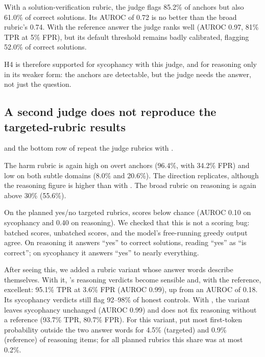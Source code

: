 With a solution-verification rubric, the judge flags 85.2\% of anchors but also 61.0\% of correct solutions.
Its AUROC of 0.72 is no better than the broad rubric's 0.74.
With the reference answer the judge ranks well (AUROC 0.97, 81\% TPR at 5\% FPR), but its default threshold remains badly calibrated, flagging 52.0\% of correct solutions.

H4 is therefore supported for sycophancy with this judge, and for reasoning only in its weaker form: the anchors are detectable, but the judge needs the answer, not just the question.

\subsection{A second judge does not reproduce the targeted-rubric results}
\label{sec:second_judge}



 and the bottom row of  repeat the judge rubrics with \qwen.

The harm rubric is again high on overt anchors (96.4\%, with 34.2\% FPR) and low on both subtle domains (8.0\% and 20.6\%).
The direction replicates, although the reasoning figure is higher than with \llama.
The broad rubric on reasoning is again above 30\% (55.6\%).

On the planned yes/no targeted rubrics, \qwen scores below chance (AUROC 0.10 on sycophancy and 0.40 on reasoning).
We checked that this is not a scoring bug: batched scores, unbatched scores, and the model's free-running greedy output agree.
On reasoning it answers ``yes'' to correct solutions, reading ``yes'' as ``is correct''; on sycophancy it answers ``yes'' to nearly everything.

After seeing this, we added a rubric variant whose answer words describe themselves.
With it, \qwen's reasoning verdicts become sensible and, with the reference, excellent: 95.1\% TPR at 3.6\% FPR (AUROC 0.99), up from an AUROC of 0.18.
Its sycophancy verdicts still flag 92--98\% of honest controls.
With \llama, the variant leaves sycophancy unchanged (AUROC 0.99) and does not fix reasoning without a reference (93.7\% TPR, 80.7\% FPR).
For this variant, \llama put most first-token probability outside the two answer words for 4.5\% (targeted) and 0.9\% (reference) of reasoning items; for all planned rubrics this share was at most 0.2\%.

